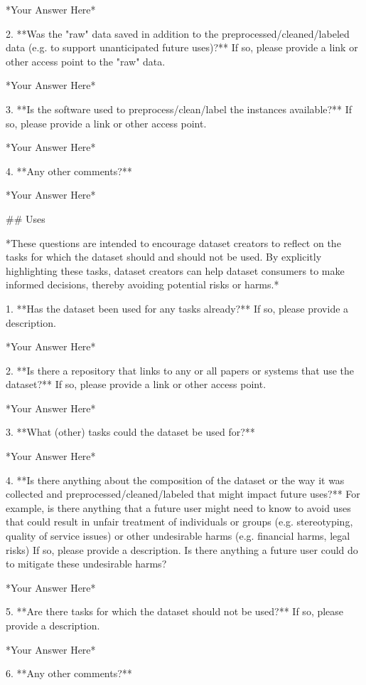 	*Your Answer Here*

2. **Was the "raw" data saved in addition to the preprocessed/cleaned/labeled data (e.g. to support unanticipated future uses)?** If so, please provide a link or other access point to the "raw" data.

	*Your Answer Here*

3. **Is the software used to preprocess/clean/label the instances available?** If so, please provide a link or other access point.

	*Your Answer Here*

4. **Any other comments?**

	*Your Answer Here*


## Uses

*These questions are intended to encourage dataset creators to reflect on the tasks  for  which  the  dataset  should  and  should  not  be  used.  By  explicitly highlighting these tasks, dataset creators can help dataset consumers to make informed decisions, thereby avoiding potential risks or harms.*

1. **Has the dataset been used for any tasks already?** If so, please provide a description.

	*Your Answer Here*

2. **Is there a repository that links to any or all papers or systems that use the dataset?** If so, please provide a link or other access point.

	*Your Answer Here*

3. **What (other) tasks could the dataset be used for?**

	*Your Answer Here*

4. **Is there anything about the composition of the dataset or the way it was collected and preprocessed/cleaned/labeled that might impact future uses?** For example, is there anything that a future user might need to know to avoid uses that could result in unfair treatment of individuals or groups (e.g. stereotyping, quality of service issues) or other undesirable harms (e.g. financial harms, legal risks) If so, please provide a description. Is there anything a future user could do to mitigate these undesirable harms?

	*Your Answer Here*

5. **Are there tasks for which the dataset should not be used?** If so, please provide a description.

	*Your Answer Here*

6. **Any other comments?**

